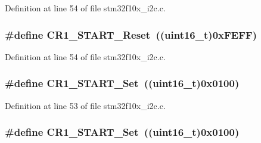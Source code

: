 Definition at line 54 of file stm32f10x\+\_\+i2c.\+c.

\subsubsection[{\texorpdfstring{C\+R1\+\_\+\+S\+T\+A\+R\+T\+\_\+\+Reset}{CR1_START_Reset}}]{\setlength{\rightskip}{0pt plus 5cm}\#define C\+R1\+\_\+\+S\+T\+A\+R\+T\+\_\+\+Reset~(({\bf uint16\+\_\+t})0x\+F\+E\+F\+F)}\hypertarget{group___i2_c___private___defines_gacc62242e31a380aec2ef9f836b3cf19d}{}\label{group___i2_c___private___defines_gacc62242e31a380aec2ef9f836b3cf19d}


Definition at line 54 of file stm32f10x\+\_\+i2c.\+c.

\subsubsection[{\texorpdfstring{C\+R1\+\_\+\+S\+T\+A\+R\+T\+\_\+\+Set}{CR1_START_Set}}]{\setlength{\rightskip}{0pt plus 5cm}\#define C\+R1\+\_\+\+S\+T\+A\+R\+T\+\_\+\+Set~(({\bf uint16\+\_\+t})0x0100)}\hypertarget{group___i2_c___private___defines_ga53820dd338da9779d039718148184ef9}{}\label{group___i2_c___private___defines_ga53820dd338da9779d039718148184ef9}


Definition at line 53 of file stm32f10x\+\_\+i2c.\+c.

\subsubsection[{\texorpdfstring{C\+R1\+\_\+\+S\+T\+A\+R\+T\+\_\+\+Set}{CR1_START_Set}}]{\setlength{\rightskip}{0pt plus 5cm}\#define C\+R1\+\_\+\+S\+T\+A\+R\+T\+\_\+\+Set~(({\bf uint16\+\_\+t})0x0100)}\hypertarget{group___i2_c___private___defines_ga53820dd338da9779d039718148184ef9}{}\label{group___i2_c___private___defines_ga53820dd338da9779d039718148184ef9}


